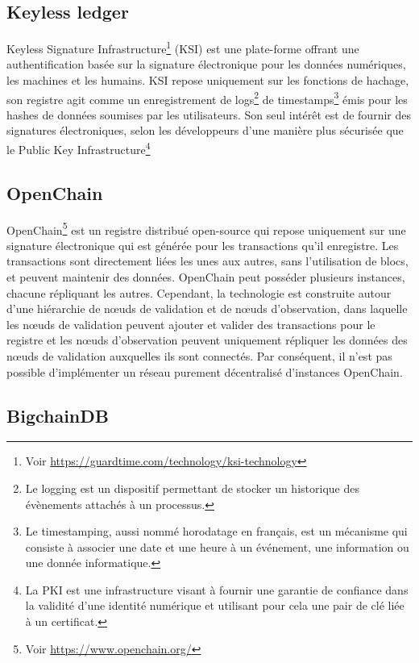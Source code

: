 \documentclass{tnreport}
\begin{document}
\subsection{Keyless ledger}

Keyless Signature Infrastructure\footnote{Voir \url{https://guardtime.com/technology/ksi-technology}} (KSI) est une plate-forme offrant une authentification basée sur la signature électronique pour les données numériques, les machines et les humains. KSI repose uniquement sur les fonctions de hachage, son registre agit comme un enregistrement de logs\footnote{Le logging est un dispositif permettant de stocker un historique des évènements attachés à un processus.} de timestamps\footnote{Le timestamping, aussi nommé horodatage en français, est un mécanisme qui consiste à associer une date et une heure à un événement, une information ou une donnée informatique.} émis pour les hashes de données soumises par les utilisateurs. Son seul intérêt est de fournir des signatures électroniques, selon les développeurs d'une manière plus sécurisée que le Public Key Infrastructure\footnote{La PKI est une infrastructure visant à fournir une garantie de confiance dans la validité d’une identité numérique et utilisant pour cela une pair de clé liée à un certificat.}

\subsection{OpenChain}

OpenChain\footnote{Voir \url{https://www.openchain.org/}} est un registre distribué open-source qui repose uniquement sur une signature électronique qui est générée pour les transactions qu'il enregistre. Les transactions sont directement liées les unes aux autres, sans l'utilisation de blocs, et peuvent maintenir des données. OpenChain peut posséder plusieurs instances, chacune répliquant les autres. Cependant, la technologie est construite autour d'une hiérarchie de nœuds de validation et de nœuds d'observation, dans laquelle les nœuds de validation peuvent ajouter et valider des transactions pour le registre et les nœuds d'observation peuvent uniquement répliquer les données des nœuds de validation auxquelles ils sont connectés. Par conséquent, il n'est pas possible d'implémenter un réseau purement décentralisé d'instances OpenChain.

\subsection{BigchainDB}
\end{document}
